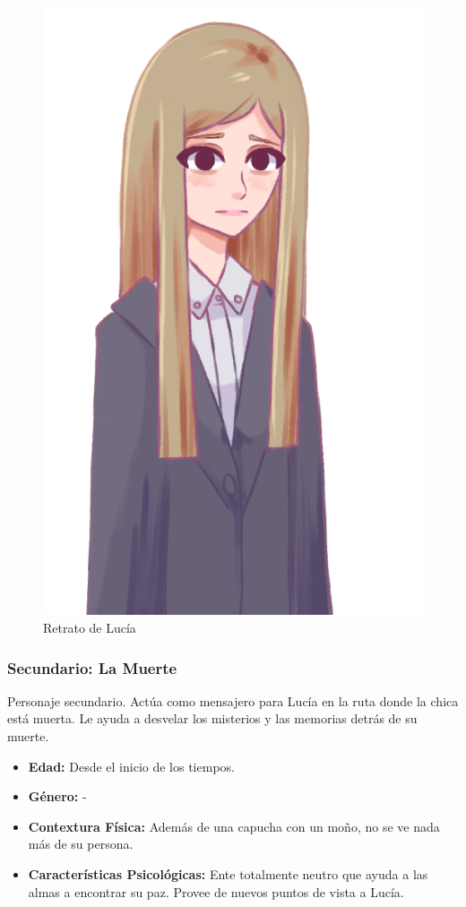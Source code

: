 \begin{figure}[h]
    \centering
    \includegraphics{imgs/lucia.png}
    \caption{Retrato de Lucía}
    \label{fig:lucia}
\end{figure}

\subsubsection{Secundario: La Muerte}
Personaje secundario. Actúa como mensajero para Lucía en la ruta donde la chica está muerta. Le ayuda a desvelar los misterios y las memorias detrás de su muerte.

\begin{itemize}
    \item \textbf{Edad:} Desde el inicio de los tiempos.
    \item \textbf{Género:} -
    \item \textbf{Contextura Física:} Además de una capucha con un moño, no se ve nada más de su persona.
    \item \textbf{Características Psicológicas:} Ente totalmente neutro que ayuda a las almas a encontrar su paz. Provee de nuevos puntos de vista a Lucía.
\end{itemize}

